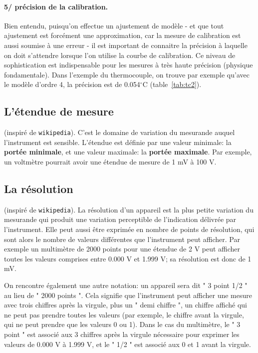 \paragraph{5/ précision de la calibration.} Bien entendu, puisqu'on effectue un ajustement de modèle - et que tout ajustement est forcément une approximation, car la mesure de calibration est aussi soumise à une erreur - il est important de connaitre la précision à laquelle on doit s'attendre lorsque l'on utilise la courbe de calibration. Ce niveau de sophistication est indispensable pour les mesures à très haute précision (physique fondamentale). Dans l'exemple du thermocouple, on trouve par exemple qu'avec le modèle d'ordre 4, la précision est de 0.054$^\circ$C (table~\ref{tab:tc2}).

\subsection{L'étendue de mesure}\label{sec:etd}

(inspiré de \texttt{wikipedia}). C'est le domaine de variation du mesurande auquel l'instrument est sensible. L'étendue est définie par une valeur minimale: la \textbf{portée minimale}, et une valeur maximale: la \textbf{portée maximale}. Par exemple, un voltmètre pourrait avoir une étendue de mesure de 1 mV à 100 V.

\subsection{La résolution}

(inspiré de \texttt{wikipedia}). La résolution d'un appareil est la plus petite variation du mesurande qui produit une variation perceptible de l'indication délivrée par l'instrument. Elle peut aussi être exprimée en nombre de points de résolution, qui sont alors le nombre de valeurs différentes que l'instrument peut afficher. Par exemple un multimètre de 2000 points pour une étendue de 2 V peut afficher toutes les valeurs comprises entre 0.000 V et 1.999 V; sa résolution est donc de 1 mV.

On rencontre également une autre notation: un appareil sera dit " 3 point 1/2 " au lieu de " 2000 points ". Cela signifie que l'instrument peut afficher une mesure avec trois chiffres après la virgule, plus un " demi chiffre ", un chiffre affiché qui ne peut pas prendre toutes les valeurs (par exemple, le chiffre avant la virgule, qui ne peut prendre que les valeurs 0 ou 1). Dans le cas du multimètre, le " 3 point " est associé aux 3 chiffres après la virgule nécessaire pour exprimer les valeurs de 0.000 V à 1.999 V, et le " 1/2 " est associé aux 0 et 1 avant la virgule.

